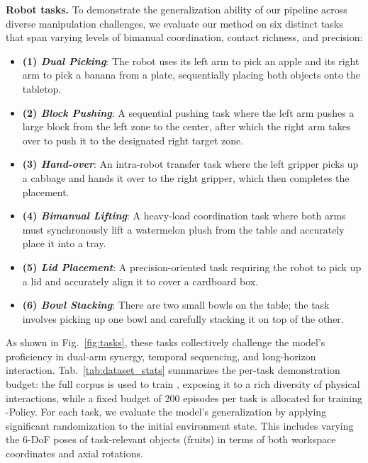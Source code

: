 \noindent 
\textbf{Robot tasks.}
\label{sec:tasks}
To demonstrate the generalization ability of our pipeline across diverse manipulation challenges, we evaluate our method on six distinct tasks that span varying levels of bimanual coordination, contact richness, and precision: 
\begin{itemize}[labelsep=0.6em, leftmargin=1.2em,itemindent=0em]
    \item \textbf{(1) \textit{Dual Picking}}: The robot uses its left arm to pick an apple and its right arm to pick a banana from a plate, sequentially placing both objects onto the tabletop.
    
    \item \textbf{(2) \textit{Block Pushing}}: A sequential pushing task where the left arm pushes a large block from the left zone to the center, after which the right arm takes over to push it to the designated right target zone.

    \item \textbf{(3) \textit{Hand-over}}: An intra-robot transfer task where the left gripper picks up a cabbage and hands it over to the right gripper, which then completes the placement.
    
    \item \textbf{(4) \textit{Bimanual Lifting}}: A heavy-load coordination task where both arms must synchronously lift a watermelon plush from the table and accurately place it into a tray.
    
    \item \textbf{(5) \textit{Lid Placement}}: A precision-oriented task requiring the robot to pick up a lid and accurately align it to cover a cardboard box.
    
    \item \textbf{(6) \textit{Bowl Stacking}}: There are two small bowls on the table; the task involves picking up one bowl and carefully stacking it on top of the other.
\end{itemize}





As shown in Fig.~\ref{fig:tasks}, these tasks collectively challenge the model's proficiency in dual-arm synergy, temporal sequencing, and long-horizon interaction.
Tab.~\ref{tab:dataset_stats} summarizes the per-task demonstration
budget: the full corpus is used to train \our, exposing it to a rich
diversity of physical interactions, while a fixed budget of 200 episodes
per task is allocated for training \our-Policy. 
For each task, we evaluate the model's generalization by applying significant randomization to the initial environment state. This includes varying the 6-DoF poses of task-relevant objects (\eg fruits) in terms of both workspace coordinates and axial rotations.

